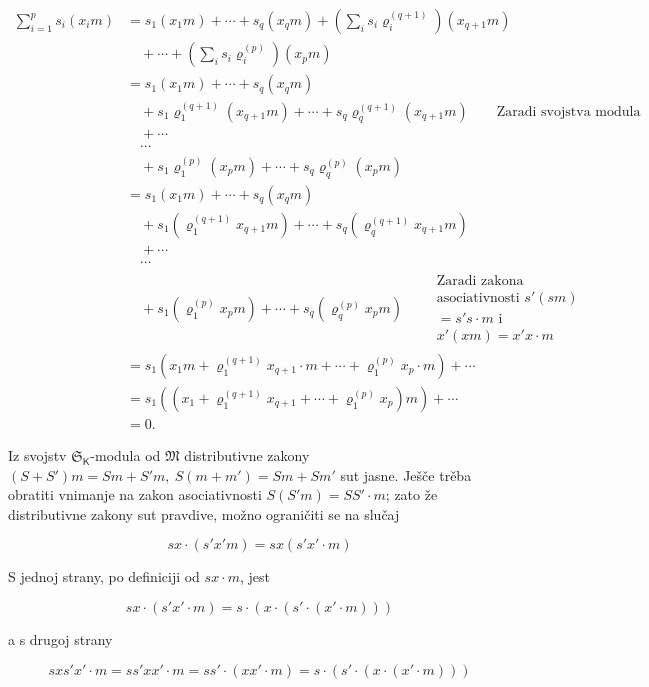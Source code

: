 \documentclass[11pt]{article}
\begin{document}
\[
\begin{aligned}
\sum_{i=1}^{p}s_i(x_i m)
&=s_1(x_1m)+\cdots+s_q(x_qm)
  +\left(\sum_i s_i\varrho_i^{(q+1)}\right)(x_{q+1}m)\\
&\quad+\cdots+\left(\sum_i s_i\varrho_i^{(p)}\right)(x_pm)\\
&=s_1(x_1m)+\cdots+s_q(x_qm)\\
&\quad+s_1\varrho_1^{(q+1)}(x_{q+1}m)+\cdots+s_q\varrho_q^{(q+1)}(x_{q+1}m)
  \qquad\text{Zaradi svojstva modula}\\
&\quad+\cdots\\
&\quad\cdots\\
&\quad+s_1\varrho_1^{(p)}(x_pm)+\cdots+s_q\varrho_q^{(p)}(x_pm)\\
&=s_1(x_1m)+\cdots+s_q(x_qm)\\
&\quad+s_1(\varrho_1^{(q+1)}x_{q+1}m)+\cdots+s_q(\varrho_q^{(q+1)}x_{q+1}m)\\
&\quad+\cdots\\
&\quad\cdots\\
&\quad+s_1(\varrho_1^{(p)}x_pm)+\cdots+s_q(\varrho_q^{(p)}x_pm)
  \qquad\begin{gathered}\text{Zaradi zakona}\\ \text{asociativnosti }s'(sm)\\ =s's\cdot m\text{ i}\\ x'(xm)=x'x\cdot m\end{gathered}\\
&=s_1\left(x_1m+\varrho_1^{(q+1)}x_{q+1}\cdot m+\cdots+\varrho_1^{(p)}x_p\cdot m\right)+\cdots\\
&=s_1\left(\left(x_1+\varrho_1^{(q+1)}x_{q+1}+\cdots+\varrho_1^{(p)}x_p\right)m\right)+\cdots\\
&=0.
\end{aligned}
\]


Iz svojstv \(\mathfrak S_{\mathsf K}\)-modula od \(\mathfrak M\) distributivne zakony \((S+S')m=Sm+S'm,\ S(m+m')=Sm+Sm'\) sut jasne. Ješče trěba obratiti vnimanje na zakon asociativnosti \(S(S'm)=SS'\cdot m\); zato že distributivne zakony sut pravdive, možno ograničiti se na slučaj

\[
sx\cdot(s'x' m)=sx(s'x'\cdot m)
\]

S jednoj strany, po definiciji od \(sx\cdot m\), jest

\[
sx\cdot(s'x'\cdot m)=s\cdot(x\cdot(s'\cdot(x'\cdot m)))
\]

a s drugoj strany

\[
sx s'x'\cdot m=ss'xx'\cdot m=ss'\cdot(xx'\cdot m)
=s\cdot(s'\cdot(x\cdot(x'\cdot m)))
\]
\end{document}
